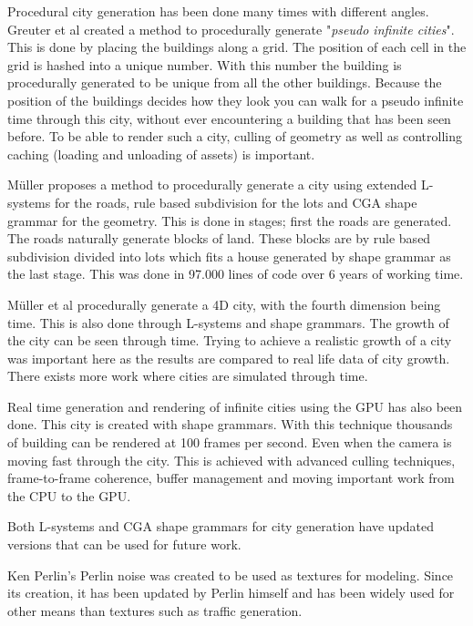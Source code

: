Procedural city generation has been done many times with different angles. Greuter et al\cite{PseudoInfiniteCities} created a method to procedurally generate "\textit{pseudo infinite cities}". This is done by placing the buildings along a grid. The position of each cell in the grid is hashed into a unique number. With this number the building is procedurally generated to be unique from all the other buildings. Because the position of the buildings decides how they look you can walk for a pseudo infinite time through this city, without ever encountering a building that has been seen before. To be able to render such a city, culling of geometry as well as controlling caching (loading and unloading of assets) is important\cite{PseudoInfiniteCities}.

\par 
M\"uller proposes a method to procedurally generate a city using extended L-systems for the roads, rule based subdivision for the lots and CGA shape grammar for the geometry\cite{ProceduralModeling6}. This is done in stages; first the roads are generated. The roads naturally generate blocks of land. These blocks are by rule based subdivision divided into lots which fits a house generated by shape grammar as the last stage. This was done in 97.000 lines of code over 6 years of working time\cite{ProceduralModeling}\cite{ProceduralModeling6}.

\par
M\"uller et al procedurally generate a 4D city, with the fourth dimension being time. This is also done through L-systems and shape grammars. The growth of the city can be seen through time. Trying to achieve a realistic growth of a city was important here as the results are compared to real life data of city growth\cite{4DCities}. There exists more work where cities are simulated through time\cite{AutonomousTimeVarying}.

\par
Real time generation and rendering of infinite cities using the GPU has also been done\cite{InfiniteCities}. This city is created with shape grammars. With this technique thousands of building can be rendered at 100 frames per second. Even when the camera is moving fast through the city. This is achieved with advanced culling techniques, frame-to-frame coherence, buffer management and moving important work from the CPU to the GPU\cite{InfiniteCities}.

\par
Both L-systems and CGA shape grammars for city generation have updated versions that can be used for future work\cite{InteractiveProceduralStreet}\cite{AdvancedProceduralModel}.

\par
Ken Perlin's Perlin noise was created to be used as textures for modeling. Since its creation, it has been updated by Perlin himself and has been widely used for other means than textures such as traffic generation\cite{PerlinNoise}\cite{TrafficGenerator}.